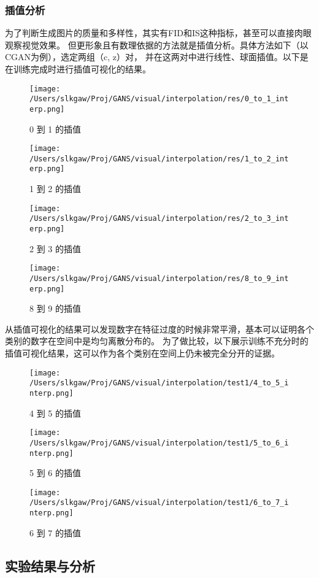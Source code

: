 \documentclass[12pt, a4paper]{article}
\begin{document}
\subsubsection{插值分析}
为了判断生成图片的质量和多样性，其实有FID和IS这种指标，甚至可以直接肉眼观察视觉效果。
但更形象且有数理依据的方法就是插值分析。具体方法如下（以CGAN为例），选定两组（c, z）对，
并在这两对中进行线性、球面插值。以下是在训练完成时进行插值可视化的结果。
\begin{figure}[htbp]
    \centering
    \texttt{[image: /Users/slkgaw/Proj/GANS/visual/interpolation/res/0\_to\_1\_interp.png]}
    \caption{0 到 1 的插值}
    \label{fig:interp01}
    \vspace{0.8cm} %
    \texttt{[image: /Users/slkgaw/Proj/GANS/visual/interpolation/res/1\_to\_2\_interp.png]}
    \caption{1 到 2 的插值}
    \label{fig:interp12}
    \vspace{0.8cm} %
    \texttt{[image: /Users/slkgaw/Proj/GANS/visual/interpolation/res/2\_to\_3\_interp.png]}
    \caption{2 到 3 的插值}
    \label{fig:interp23}
    \vspace{0.8cm} %
    \texttt{[image: /Users/slkgaw/Proj/GANS/visual/interpolation/res/8\_to\_9\_interp.png]}
    \caption{8 到 9 的插值}
    \label{fig:interp89}
\end{figure}
从插值可视化的结果可以发现数字在特征过度的时候非常平滑，基本可以证明各个类别的数字在空间中是均匀离散分布的。
为了做比较，以下展示训练不充分时的插值可视化结果，这可以作为各个类别在空间上仍未被完全分开的证据。
\begin{figure}[htbp]
    \centering
    \texttt{[image: /Users/slkgaw/Proj/GANS/visual/interpolation/test1/4\_to\_5\_interp.png]}
    \caption{4 到 5 的插值}
    \label{fig:interp45}
    \vspace{0.8cm} %
    \texttt{[image: /Users/slkgaw/Proj/GANS/visual/interpolation/test1/5\_to\_6\_interp.png]}
    \caption{5 到 6 的插值}
    \label{fig:interp56}
    \vspace{0.8cm} %
    \texttt{[image: /Users/slkgaw/Proj/GANS/visual/interpolation/test1/6\_to\_7\_interp.png]}
    \caption{6 到 7 的插值}
    \label{fig:interp67}

\end{figure}

\subsection{实验结果与分析}
\end{document}
